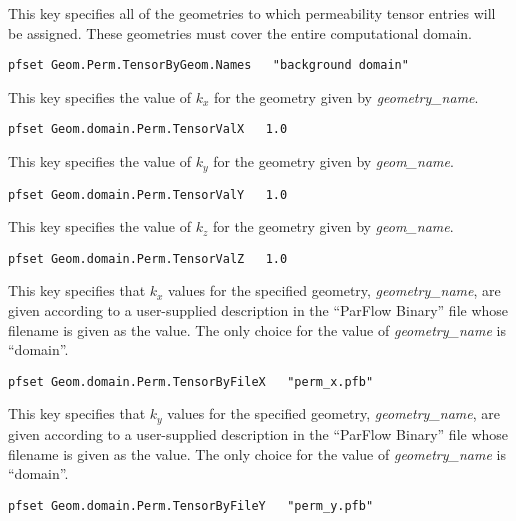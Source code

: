 {
This key specifies all of the geometries to which permeability tensor entries
will be assigned.  These geometries must cover the entire computational
domain.
}
\begin{display}\begin{verbatim}
pfset Geom.Perm.TensorByGeom.Names   "background domain"
\end{verbatim}\end{display}

{
This key specifies the value of $k_x$ for the geometry given by {\em
geometry\_name}.
}
\begin{display}\begin{verbatim}
pfset Geom.domain.Perm.TensorValX   1.0
\end{verbatim}\end{display}

{
This key specifies the value of $k_y$ for the geometry given by {\em
geom\_name}.
}
\begin{display}\begin{verbatim}
pfset Geom.domain.Perm.TensorValY   1.0
\end{verbatim}\end{display}

{
This key specifies the value of $k_z$ for the geometry given by {\em
geom\_name}.
}
\begin{display}\begin{verbatim}
pfset Geom.domain.Perm.TensorValZ   1.0
\end{verbatim}\end{display}

{
This key specifies that $k_x$ values for the specified geometry,
{\em geometry\_name}, are given according to a user-supplied description
in the ``ParFlow Binary'' file whose filename is given as the value.
The only choice for the value of {\em geometry\_name} is ``domain''.
}
\begin{display}\begin{verbatim}
pfset Geom.domain.Perm.TensorByFileX   "perm_x.pfb"
\end{verbatim}\end{display}

{
This key specifies that $k_y$ values for the specified geometry,
{\em geometry\_name}, are given according to a user-supplied description
in the ``ParFlow Binary'' file whose filename is given as the value.
The only choice for the value of {\em geometry\_name} is ``domain''.
}
\begin{display}\begin{verbatim}
pfset Geom.domain.Perm.TensorByFileY   "perm_y.pfb"
\end{verbatim}\end{display}

